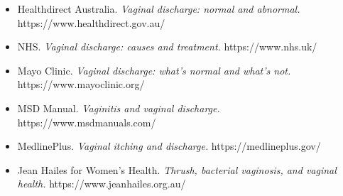 \begin{itemize}
    \item Healthdirect Australia. \textit{Vaginal discharge: normal and abnormal.} https://www.healthdirect.gov.au/
    \item NHS. \textit{Vaginal discharge: causes and treatment.} https://www.nhs.uk/
    \item Mayo Clinic. \textit{Vaginal discharge: what's normal and what's not.} https://www.mayoclinic.org/
    \item MSD Manual. \textit{Vaginitis and vaginal discharge.} https://www.msdmanuals.com/
    \item MedlinePlus. \textit{Vaginal itching and discharge.} https://medlineplus.gov/
    \item Jean Hailes for Women's Health. \textit{Thrush, bacterial vaginosis, and vaginal health.} https://www.jeanhailes.org.au/
\end{itemize}
